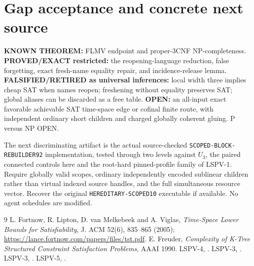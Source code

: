 \documentclass[11pt]{article}
\begin{document}
\section{Gap acceptance and concrete next source}
\noindent\textbf{KNOWN THEOREM:} FLMV endpoint and
proper-3CNF NP-completeness. \textbf{PROVED/EXACT restricted:}
the reopening-language reduction, false forgetting, exact
fresh-name equality repair, and incidence-release lemma.
\textbf{FALSIFIED/RETIRED as universal inferences:}
local width three implies cheap SAT when names reopen;
freshening without equality preserves SAT; global aliases
can be discarded as a free table. \textbf{OPEN:}
an all-input exact favorable achievable SAT time-space edge
or cofinal finite route, with independent ordinary short
children and charged globally coherent gluing. P versus NP OPEN.

The next discriminating artifact is the actual source-checked
\texttt{SCOPED-BLOCK-REBUILDER92} implementation, tested through
two levels against $U_3$, the paired connected controls here
and the root-hard pinned-profile family of LSPV-1.
Require globally valid scopes, ordinary independently encoded
sublinear children rather than virtual indexed source handles,
and the full simultaneous resource vector. Recover the original
\texttt{HEREDITARY-SCOPED10} executable if available.
No agent schedules are modified.

\begin{thebibliography}{9}
 L. Fortnow, R. Lipton, D. van Melkebeek
and A. Viglas, \emph{Time-Space Lower Bounds for
Satisfiability}, J. ACM 52(6), 835--865 (2005);
\url{https://lance.fortnow.com/papers/files/tst.pdf}.
 E. Freuder, \emph{Complexity of K-Tree
Structured Constraint Satisfaction Problems}, AAAI 1990.
 LSPV-4,
.
 LSPV-3,
.
 LSPV-3,
.
 LSPV-5,
.
\end{thebibliography}
\end{document}
